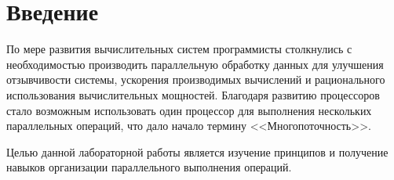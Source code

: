 \chapter*{Введение}

По мере развития вычислительных систем программисты столкнулись с
необходимостью производить параллельную обработку данных для улучшения отзывчивости системы, ускорения производимых вычислений и рационального использования вычислительных мощностей. Благодаря развитию
процессоров стало возможным использовать один процессор для выполнения нескольких параллельных операций, что дало начало термину <<Многопоточность>>.

Целью данной лабораторной работы является изучение принципов и получение навыков организации параллельного выполнения операций.

